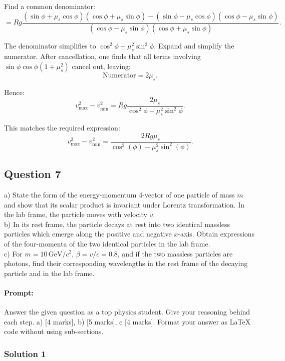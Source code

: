 \documentclass{article}
\begin{document}
Find a common denominator:
\[
= Rg \frac{(\sin\phi + \mu_s \cos\phi)(\cos\phi + \mu_s \sin\phi) - (\sin\phi - \mu_s \cos\phi)(\cos\phi - \mu_s \sin\phi)}{(\cos\phi - \mu_s \sin\phi)(\cos\phi + \mu_s \sin\phi)}.
\]

The denominator simplifies to $\cos^2\phi - \mu_s^2 \sin^2\phi$. Expand and simplify the numerator. After cancellation, one finds that all terms involving $\sin\phi\cos\phi(1+\mu_s^2)$ cancel out, leaving:
\[
\text{Numerator} = 2\mu_s.
\]

Hence:
\[
v_{\max}^2 - v_{\min}^2 = Rg \frac{2\mu_s}{\cos^2\phi - \mu_s^2 \sin^2\phi}.
\]

This matches the required expression:
\[
\boxed{v_{\max}^2 - v_{\min}^2 = \frac{2R g \mu_s}{\cos^2(\phi) - \mu_s^2 \sin^2(\phi)}}.
\]


\subsection{Question 7}

a) State the form of the energy-momentum 4-vector of one particle of mass \(m\) and show that its scalar product is invariant under Lorentz transformation. In the lab frame, the particle moves with velocity \(v\). \\ 

b) In its rest frame, the particle decays at rest into two identical massless particles which emerge along the positive and negative \(x\)-axis. Obtain expressions of the four-momenta of the two identical particles in the lab frame. \\ 

c) For \(m = 10 \, \text{GeV}/c^2\), \(\beta = v/c = 0.8\), and if the two massless particles are photons, find their corresponding wavelengths in the rest frame of the decaying particle and in the lab frame. \\

\paragraph{Prompt: \\} 
Answer the given question as a top physics student. Give your reasoning behind each step. a) [4 marks], b) [5 marks], c [4 marks].
Format your answer as LaTeX code without using sub-sections.

\subsubsection{Solution 1}
\end{document}
